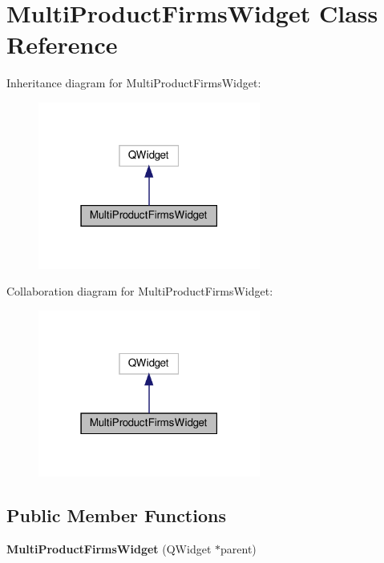 \hypertarget{classMultiProductFirmsWidget}{}\section{Multi\+Product\+Firms\+Widget Class Reference}
\label{classMultiProductFirmsWidget}


Inheritance diagram for Multi\+Product\+Firms\+Widget\+:
\nopagebreak
\begin{figure}[H]
\begin{center}
\leavevmode
\includegraphics[width=207pt]{classMultiProductFirmsWidget__inherit__graph}
\end{center}
\end{figure}


Collaboration diagram for Multi\+Product\+Firms\+Widget\+:
\nopagebreak
\begin{figure}[H]
\begin{center}
\leavevmode
\includegraphics[width=207pt]{classMultiProductFirmsWidget__coll__graph}
\end{center}
\end{figure}
\subsection*{Public Member Functions}
\begin{DoxyCompactItemize}
\item 
\mbox{\label{classMultiProductFirmsWidget_a08715f8dd7f9d2bbe0a3686aa41e9462}} 
{\bfseries Multi\+Product\+Firms\+Widget} (Q\+Widget $\ast$parent)
\end{DoxyCompactItemize}


